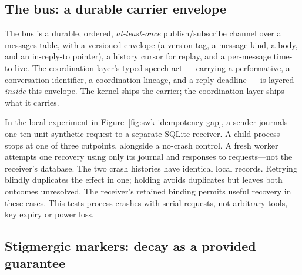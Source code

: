 \documentclass[11pt,a4paper]{article}
\theoremstyle{definition}
\theoremstyle{remark}
\begin{document}
\subsection{The bus: a durable carrier envelope}

The bus is a durable, ordered, \emph{at-least-once} publish/subscribe channel over
a messages table, with a versioned envelope (a version tag, a message kind, a body,
and an in-reply-to pointer), a history cursor for replay, and a per-message
time-to-live. The coordination layer's typed speech act --- carrying a
performative, a conversation identifier, a coordination lineage, and a reply
deadline --- is layered \emph{inside} this envelope. The kernel ships the carrier;
the coordination layer ships what it carries.


In the local experiment in Figure~\ref{fig:swk-idempotency-gap}, a sender
journals one ten-unit synthetic request to a separate SQLite receiver. A child
process stops at one of three cutpoints, alongside a no-crash control. A fresh
worker attempts one recovery using only its journal and responses to
requests---not the receiver's database. The two crash histories
have identical local records. Retrying blindly duplicates the effect in one;
holding avoids duplicates but leaves both outcomes unresolved. The receiver's
retained binding permits useful recovery in these cases. This tests process
crashes with serial requests, not arbitrary tools, key expiry or power loss.



\pagebreak[4]
\subsection{Stigmergic markers: decay as a provided guarantee}
\end{document}
